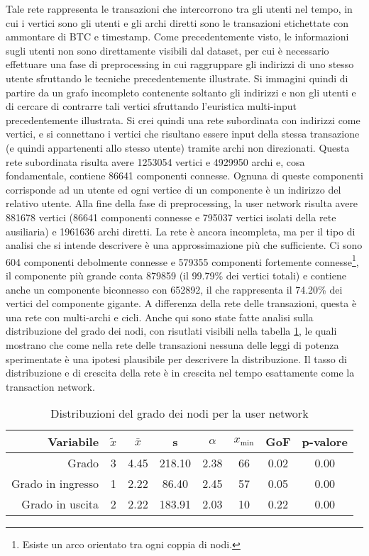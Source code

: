 Tale rete rappresenta le transazioni che intercorrono tra gli utenti nel tempo, in cui i vertici sono gli utenti e gli archi diretti sono le transazioni etichettate con ammontare di BTC e timestamp.
Come precedentemente visto, le informazioni sugli utenti non sono direttamente visibili dal dataset, per cui è necessario effettuare una fase di preprocessing in cui raggruppare gli indirizzi di uno stesso utente sfruttando le tecniche precedentemente illustrate.
Si immagini quindi di partire da un grafo incompleto contenente soltanto gli indirizzi e non gli utenti e di cercare di contrarre tali vertici sfruttando l'euristica multi-input precedentemente illustrata.
Si crei quindi una rete subordinata con indirizzi come vertici, e si connettano i vertici che risultano essere input della stessa transazione (e quindi appartenenti allo stesso utente) tramite archi non direzionati. Questa rete subordinata risulta avere 1253054 vertici e 4929950 archi e, cosa fondamentale, contiene 86641 componenti connesse. Ognuna di queste componenti corrisponde ad un utente ed ogni vertice di un componente è un indirizzo del relativo utente.
Alla fine della fase di preprocessing, la user network risulta avere 881678 vertici (86641 componenti connesse e 795037 vertici isolati della rete ausiliaria) e 1961636 archi diretti. La rete è ancora incompleta, ma per il tipo di analisi che si intende descrivere è una approssimazione più che sufficiente. Ci sono 604 componenti debolmente connesse e 579355 componenti fortemente connesse\footnote{Esiste un arco orientato tra ogni coppia di nodi.}, il componente più grande conta 879859 (il 99.79\% dei vertici totali) e contiene anche un componente biconnesso con 652892, il che rappresenta il 74.20\% dei vertici del componente gigante.
A differenza della rete delle transazioni, questa è una rete con multi-archi e cicli.
Anche qui sono state fatte analisi sulla distribuzione del grado dei nodi, con risutlati visibili nella tabella \ref{table:gofuser}, le quali mostrano che come nella rete delle transazioni nessuna delle leggi di potenza sperimentate è una ipotesi plausibile per descrivere la distribuzione. Il tasso di distribuzione e di crescita della rete è in crescita nel tempo esattamente come la transaction network.

\begin{table}
\centering
\label{table:gofuser}
\caption{Distribuzioni del grado dei nodi per la user network}
\begin{tabular}{r | c c c c c c c}
\textbf{Variabile} & \textbf{$\tilde{x}$} & \textbf{$\bar{x}$} & \textbf{s} & \textbf{$\alpha$} & \textbf{$x_\text{min}$} & \textbf{GoF} & \textbf{p-valore} \\
\hline
Grado & 3 & 4.45 & 218.10 & 2.38 & 66 & 0.02 & 0.00 \\
Grado in ingresso & 1 & 2.22 & 86.40 & 2.45 & 57 & 0.05 & 0.00 \\
Grado in uscita & 2 & 2.22 & 183.91 & 2.03 & 10 & 0.22 & 0.00 \\
\end{tabular}
\end{table}

